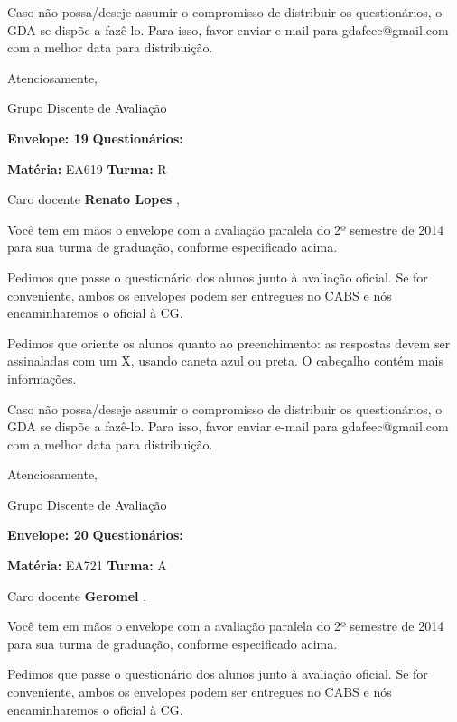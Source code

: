 \documentclass[a5paper]{letter}
\begin{document}
	Caso não possa/deseje assumir o compromisso de distribuir os questionários, o GDA se dispõe a fazê-lo. Para isso, favor enviar e-mail para gdafeec@gmail.com com a melhor data para distribuição.


Atenciosamente, 

Grupo Discente de Avaliação

\vspace{0.5cm}

{\bf Envelope: 19 }		\hfill	{\bf Questionários:} \hspace{2cm}

\newpage
\thispagestyle{empty}

\hfill {\bf Matéria:} EA619 {\bf Turma:} R

Caro docente {\bf Renato Lopes }, 

	Você tem em mãos o envelope com a avaliação paralela do 2º semestre de 2014 para sua turma de graduação, conforme especificado acima.

	Pedimos que passe o questionário dos alunos junto à avaliação oficial. Se for conveniente, ambos os envelopes podem ser entregues no CABS e nós encaminharemos o oficial à CG.

Pedimos que oriente os alunos quanto ao preenchimento: as respostas devem ser assinaladas com um X, usando caneta azul ou preta. O cabeçalho contém mais informações.

	Caso não possa/deseje assumir o compromisso de distribuir os questionários, o GDA se dispõe a fazê-lo. Para isso, favor enviar e-mail para gdafeec@gmail.com com a melhor data para distribuição.


Atenciosamente, 

Grupo Discente de Avaliação

\vspace{0.5cm}

{\bf Envelope: 20 }		\hfill	{\bf Questionários:} \hspace{2cm}

\newpage
\thispagestyle{empty}

\hfill {\bf Matéria:} EA721 {\bf Turma:} A

Caro docente {\bf Geromel }, 

	Você tem em mãos o envelope com a avaliação paralela do 2º semestre de 2014 para sua turma de graduação, conforme especificado acima.

	Pedimos que passe o questionário dos alunos junto à avaliação oficial. Se for conveniente, ambos os envelopes podem ser entregues no CABS e nós encaminharemos o oficial à CG.
\end{document}
